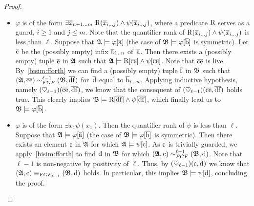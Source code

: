 \begin{proof}
\begin{itemize}
  \item $\varphi$ is of the form $\exists{\vartuplexfromto{n{+}1}{m}}\ \relR(\vartuplexfromto{i}{j}) \land \psi(\vartuplexfromto{i}{j})$, where a predicate $\mathrm{R}$ serves as a guard, $i \geq 1$ and $j \leq m$.
  Note that the quantifier rank of $\mathrm{R}(\overline{\mathit{x}}_{i\ldots j}) \land \psi(\overline{\mathit{x}}_{i\ldots j})$ is less than $\ell$.
  Suppose that ${\mathfrak{A}} \models \varphi[\overline{\mathrm{a}}]$ (the case of ${\mathfrak{B}} \models \varphi[\overline{\mathrm{b}}]$ is symmetric).
  Let $\overline{\mathrm{c}}$ be the (possibly empty) infix $\overline{\mathrm{a}}_{i\ldots n}$ of~$\overline{\mathrm{a}}$.
  Then there exists a (possibly empty) tuple $\overline{\mathrm{e}}$ in ${\mathfrak{A}}$ such that ${\mathfrak{A}} \models \mathrm{R}[\overline{\mathrm{c}}\overline{\mathrm{e}}] \land \psi[\overline{\mathrm{c}}\overline{\mathrm{e}}]$.
  Note that $\overline{\mathrm{c}}\overline{\mathrm{e}}$ is live.
  By~\ref{bisim:fforth} we can find a (possibly empty) tuple $\overline{\mathrm{f}}$ in ${\mathfrak{B}}$ such that $(\str{A}, \elemtuplec\elemtuplee) \bisimto_{\FGF}^{\ell{-}1} (\str{B}, \elemtupled\elemtuplef)$ for~$\overline{\mathrm{d}}$ equal to $\overline{\mathrm{b}}_{i\ldots n}$.
  Applying inductive hypothesis, namely $(\heartsuit_{\ell{-}1})(\overline{\mathrm{c}}\overline{\mathrm{e}},\overline{\mathrm{d}}\overline{\mathrm{f}})$, we know that the consequent of $(\heartsuit_{\ell{-}1})(\overline{\mathrm{c}}\overline{\mathrm{e}},\overline{\mathrm{d}}\overline{\mathrm{f}})$ holds true.
  This clearly implies ${\mathfrak{B}} \models \mathrm{R}[\overline{\mathrm{d}}\overline{\mathrm{f}}] \land \psi[\overline{\mathrm{d}}\overline{\mathrm{f}}]$, which finally lead us to ${\mathfrak{B}} \models \varphi[\overline{\mathrm{b}}]$.

  \item $\varphi$ is of the form $\exists{x_{1}} \psi(x_1)$. Then the quantifier rank of $\psi$ is less than $\ell$.
  Suppose that ${\mathfrak{A}} \models \varphi[\overline{\mathrm{a}}]$ (the case of ${\mathfrak{B}} \models \varphi[\overline{\mathrm{b}}]$ is symmetric).
  Then there exists an element $\mathrm{c}$ in ${\mathfrak{A}}$ for which ${\mathfrak{A}} \models \psi[\mathrm{c}]$.
  As $\mathrm{c}$ is trivially guarded, we apply~\ref{bisim:fforth} to find $\mathrm{d}$ in ${\mathfrak{B}}$ for which $(\str{A}, \elem{c}) \bisimto_{\FGF}^{\ell{-}1} (\str{B}, \elem{d})$.
  Note that $\ell{-}1$ is non-negative by positivity of $\ell$. 
  Thus, by $(\heartsuit_{\ell{-}1})(\mathrm{c},\mathrm{d})$ we know that $(\str{A}, \elem{c}) \equiv_{\FGF_{\ell{-}1}} (\str{B}, \elem{d})$ holds.
  In particular, this implies ${\mathfrak{B}} \models \psi[\mathrm{d}]$, concluding the proof.
\end{itemize}


\end{proof}
